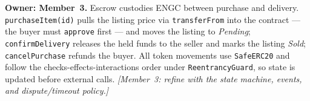 \textbf{Owner: Member~3.} Escrow custodies ENGC between purchase and delivery. \texttt{purchaseItem(id)} pulls the listing price via \texttt{transferFrom} into the contract --- the buyer must \texttt{approve} first --- and moves the listing to \emph{Pending}; \texttt{confirmDelivery} releases the held funds to the seller and marks the listing \emph{Sold}; \texttt{cancelPurchase} refunds the buyer. All token movements use \texttt{SafeERC20} and follow the checks-effects-interactions order under \texttt{ReentrancyGuard}, so state is updated before external calls. \emph{[Member~3: refine with the state machine, events, and dispute/timeout policy.]}
